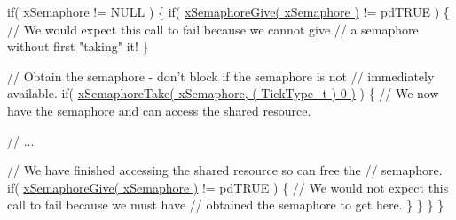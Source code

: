 \begin{DoxyPre}   if( xSemaphore != NULL )
   \{
       if( \hyperlink{semphr_8h_aae55761cabfa9bf85c8f4430f78c0953}{xSemaphoreGive( xSemaphore )} != pdTRUE )
       \{
           // We would expect this call to fail because we cannot give
           // a semaphore without first "taking" it!
       \}\end{DoxyPre}



\begin{DoxyPre}       // Obtain the semaphore - don't block if the semaphore is not
       // immediately available.
       if( \hyperlink{semphr_8h_af116e436d2a5ae5bd72dbade2b5ea930}{xSemaphoreTake( xSemaphore, ( TickType\_t ) 0 )} )
       \{
           // We now have the semaphore and can access the shared resource.\end{DoxyPre}



\begin{DoxyPre}           // ...\end{DoxyPre}



\begin{DoxyPre}           // We have finished accessing the shared resource so can free the
           // semaphore.
           if( \hyperlink{semphr_8h_aae55761cabfa9bf85c8f4430f78c0953}{xSemaphoreGive( xSemaphore )} != pdTRUE )
           \{
               // We would not expect this call to fail because we must have
               // obtained the semaphore to get here.
           \}
       \}
   \}
\}
\end{DoxyPre}
 